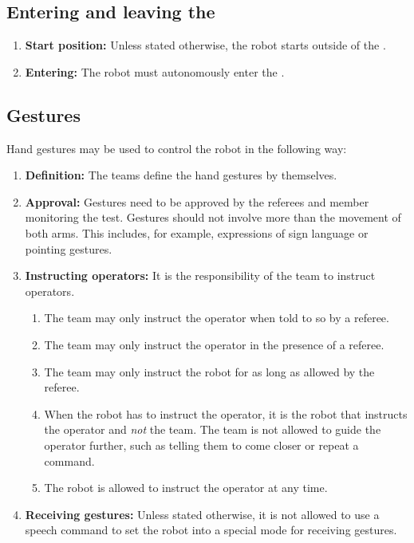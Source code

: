 \subsection{Entering and leaving the \Arena{}}\label{rule:start_position}
\begin{enumerate}

	\item \textbf{Start position:} Unless stated otherwise, the robot starts outside of the \Arena{}.
	\item \textbf{Entering:} The robot must autonomously enter the \Arena{}.
\end{enumerate}



\subsection{Gestures}\label{rule:gestures}
Hand gestures may be used to control the robot in the following way:
\begin{enumerate}
	\item \textbf{Definition:} The teams define the hand gestures by themselves.

	\item \textbf{Approval:} Gestures need to be approved by the referees and \TC{} member monitoring the test. Gestures should not involve more than the movement of both arms. This includes, for example, expressions of sign language or pointing gestures.

	\item \textbf{Instructing operators:} It is the responsibility of the team to instruct operators.
	\begin{enumerate}
		\item The team may only instruct the operator when told to so by a referee.
		\item The team may only instruct the operator in the presence of a referee.
		\item The team may only instruct the robot for as long as allowed by the referee.
		\item When the robot has to instruct the operator, it is the robot that instructs the operator and \emph{not} the team. The team is not allowed to guide the operator further, such as telling them to come closer or repeat a command.
		\item The robot is allowed to instruct the operator at any time.
	\end{enumerate}

	\item \textbf{Receiving gestures:} Unless stated otherwise, it is not allowed to use a speech command to set the robot into a special mode for receiving gestures.
\end{enumerate}




